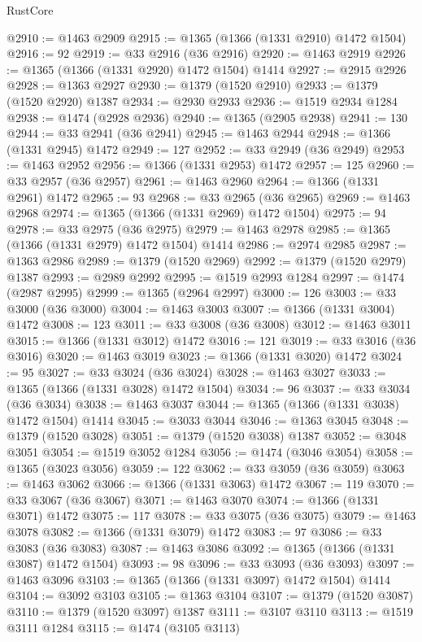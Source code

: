 \begin{lexlean}{RustCore}
\begin{coremodule}
@2910 := @1463 @2909
@2915 := @1365 (@1366 (@1331 @2910) @1472 @1504)
@2916 := 92
@2919 := @33 @2916 (@36 @2916)
@2920 := @1463 @2919
@2926 := @1365 (@1366 (@1331 @2920) @1472 @1504) @1414
@2927 := @2915 @2926
@2928 := @1363 @2927
@2930 := @1379 (@1520 @2910)
@2933 := @1379 (@1520 @2920) @1387
@2934 := @2930 @2933
@2936 := @1519 @2934 @1284
@2938 := @1474 (@2928 @2936)
@2940 := @1365 (@2905 @2938)
@2941 := 130
@2944 := @33 @2941 (@36 @2941)
@2945 := @1463 @2944
@2948 := @1366 (@1331 @2945) @1472
@2949 := 127
@2952 := @33 @2949 (@36 @2949)
@2953 := @1463 @2952
@2956 := @1366 (@1331 @2953) @1472
@2957 := 125
@2960 := @33 @2957 (@36 @2957)
@2961 := @1463 @2960
@2964 := @1366 (@1331 @2961) @1472
@2965 := 93
@2968 := @33 @2965 (@36 @2965)
@2969 := @1463 @2968
@2974 := @1365 (@1366 (@1331 @2969) @1472 @1504)
@2975 := 94
@2978 := @33 @2975 (@36 @2975)
@2979 := @1463 @2978
@2985 := @1365 (@1366 (@1331 @2979) @1472 @1504) @1414
@2986 := @2974 @2985
@2987 := @1363 @2986
@2989 := @1379 (@1520 @2969)
@2992 := @1379 (@1520 @2979) @1387
@2993 := @2989 @2992
@2995 := @1519 @2993 @1284
@2997 := @1474 (@2987 @2995)
@2999 := @1365 (@2964 @2997)
@3000 := 126
@3003 := @33 @3000 (@36 @3000)
@3004 := @1463 @3003
@3007 := @1366 (@1331 @3004) @1472
@3008 := 123
@3011 := @33 @3008 (@36 @3008)
@3012 := @1463 @3011
@3015 := @1366 (@1331 @3012) @1472
@3016 := 121
@3019 := @33 @3016 (@36 @3016)
@3020 := @1463 @3019
@3023 := @1366 (@1331 @3020) @1472
@3024 := 95
@3027 := @33 @3024 (@36 @3024)
@3028 := @1463 @3027
@3033 := @1365 (@1366 (@1331 @3028) @1472 @1504)
@3034 := 96
@3037 := @33 @3034 (@36 @3034)
@3038 := @1463 @3037
@3044 := @1365 (@1366 (@1331 @3038) @1472 @1504) @1414
@3045 := @3033 @3044
@3046 := @1363 @3045
@3048 := @1379 (@1520 @3028)
@3051 := @1379 (@1520 @3038) @1387
@3052 := @3048 @3051
@3054 := @1519 @3052 @1284
@3056 := @1474 (@3046 @3054)
@3058 := @1365 (@3023 @3056)
@3059 := 122
@3062 := @33 @3059 (@36 @3059)
@3063 := @1463 @3062
@3066 := @1366 (@1331 @3063) @1472
@3067 := 119
@3070 := @33 @3067 (@36 @3067)
@3071 := @1463 @3070
@3074 := @1366 (@1331 @3071) @1472
@3075 := 117
@3078 := @33 @3075 (@36 @3075)
@3079 := @1463 @3078
@3082 := @1366 (@1331 @3079) @1472
@3083 := 97
@3086 := @33 @3083 (@36 @3083)
@3087 := @1463 @3086
@3092 := @1365 (@1366 (@1331 @3087) @1472 @1504)
@3093 := 98
@3096 := @33 @3093 (@36 @3093)
@3097 := @1463 @3096
@3103 := @1365 (@1366 (@1331 @3097) @1472 @1504) @1414
@3104 := @3092 @3103
@3105 := @1363 @3104
@3107 := @1379 (@1520 @3087)
@3110 := @1379 (@1520 @3097) @1387
@3111 := @3107 @3110
@3113 := @1519 @3111 @1284
@3115 := @1474 (@3105 @3113)

\end{coremodule}
\end{lexlean}

